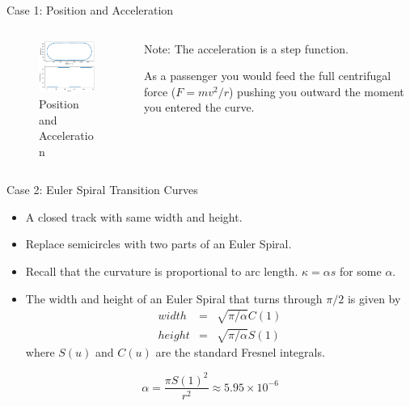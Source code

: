 \documentclass{beamer}
\begin{document}
\begin{frame}{Case 1: Position and Acceleration}
	\begin{columns}
		\begin{column}{0.8\textwidth}			
			\begin{figure}
				\caption{Position and Acceleration}
				\centering
				\includegraphics[width=70mm, scale=0.2]{circular_track.png}
			\end{figure}
		\end{column}
		\begin{column}{0.33\textwidth}
			Note: The acceleration is a step function. 
			
			
			As a passenger you would feed the full centrifugal force ({\alert{$F=mv^2/r$}}) pushing you outward the moment you entered the curve. 		
		\end{column}
	\end{columns}
\end{frame}


\begin{frame}{Case 2: Euler Spiral Transition Curves}
	\begin{itemize}
		\item A closed track with same width and height. 
		\item Replace semicircles with two parts of an Euler Spiral.
		\item Recall that the curvature is proportional to arc length. $\kappa = \alpha s $ for some $\alpha$.
		\item The width and height of an Euler Spiral that turns through $\pi/2$ is given by 
		\begin{eqnarray*}
			width &=& \sqrt{\pi / \alpha} C(1) \\
			height &=& \sqrt{\pi /\alpha}S(1)
		\end{eqnarray*}
		where $S(u)$ and $C(u)$ are the standard Fresnel integrals.
	
	\end{itemize}
	
	\[
	\alpha = \frac{\pi S(1)^2}{r^2} \approx 5.95 \times 10 ^{-6}
	\]
	
\end{frame}
\end{document}
